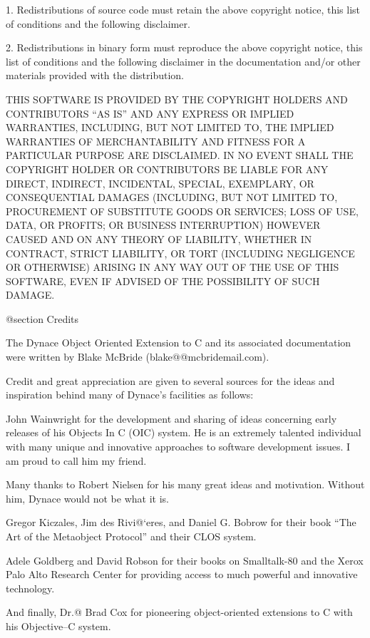 1. Redistributions of source code must retain the above copyright
notice, this list of conditions and the following disclaimer.

2. Redistributions in binary form must reproduce the above copyright
notice, this list of conditions and the following disclaimer in the
documentation and/or other materials provided with the distribution.

THIS SOFTWARE IS PROVIDED BY THE COPYRIGHT HOLDERS AND CONTRIBUTORS
``AS IS'' AND ANY EXPRESS OR IMPLIED WARRANTIES, INCLUDING, BUT NOT
LIMITED TO, THE IMPLIED WARRANTIES OF MERCHANTABILITY AND FITNESS FOR
A PARTICULAR PURPOSE ARE DISCLAIMED. IN NO EVENT SHALL THE COPYRIGHT
HOLDER OR CONTRIBUTORS BE LIABLE FOR ANY DIRECT, INDIRECT, INCIDENTAL,
SPECIAL, EXEMPLARY, OR CONSEQUENTIAL DAMAGES (INCLUDING, BUT NOT
LIMITED TO, PROCUREMENT OF SUBSTITUTE GOODS OR SERVICES; LOSS OF USE,
DATA, OR PROFITS; OR BUSINESS INTERRUPTION) HOWEVER CAUSED AND ON ANY
THEORY OF LIABILITY, WHETHER IN CONTRACT, STRICT LIABILITY, OR TORT
(INCLUDING NEGLIGENCE OR OTHERWISE) ARISING IN ANY WAY OUT OF THE USE
OF THIS SOFTWARE, EVEN IF ADVISED OF THE POSSIBILITY OF SUCH DAMAGE.

@section Credits


The Dynace Object Oriented Extension to C
and its associated documentation were written by Blake McBride
(blake@@mcbridemail.com).

Credit and great appreciation are given to several sources for the
ideas and inspiration behind many of Dynace's facilities as follows:

John Wainwright for the development and sharing of ideas concerning
early releases of his Objects In C (OIC) system.  He is an extremely
talented individual with many unique and innovative approaches to
software development issues.  I am proud to call him my friend.

Many thanks to Robert Nielsen for his many great ideas and motivation.  Without him, Dynace would not be what it is.

Gregor Kiczales, Jim des Rivi@`eres, and Daniel G. Bobrow for their
book ``The Art of the Metaobject Protocol'' and their CLOS
system.

Adele Goldberg and David Robson for their books on Smalltalk-80 and
the Xerox Palo Alto Research Center for providing access to much
powerful and innovative technology.

And finally, Dr.@ Brad Cox for pioneering object-oriented extensions
to C with his Objective--C system.


